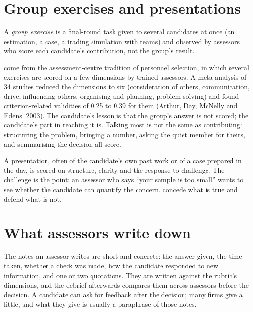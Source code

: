 \section{Group exercises and presentations}

\begin{definition}\label{def:iv:the-final-round-and-trading-games:group}
A \emph{group exercise} is a final-round task given to several candidates at once (an
estimation, a case, a trading simulation with teams) and observed by assessors who score each candidate's
contribution, not the group's result.
\end{definition}

 come from the assessment-centre tradition of personnel selection, in which several exercises
are scored on a few dimensions by trained assessors. A meta-analysis of 34 studies reduced the dimensions to
six (consideration of others, communication, drive, influencing others, organising and planning, problem
solving) and found criterion-related validities of 0.25 to 0.39 for them (Arthur, Day, McNelly and Edens,
2003). The candidate's lesson is that the group's answer is not scored; the candidate's part in reaching it
is. Talking most is not the same as contributing: structuring the problem, bringing a number, asking the quiet
member for theirs, and summarising the decision all score.

A presentation, often of the candidate's own past work or of a case prepared in the day, is scored on
structure, clarity and the response to challenge. The challenge is the point: an assessor who says ``your
sample is too small'' wants to see whether the candidate can quantify the concern, concede what is true and
defend what is not.

\section{What assessors write down}

The notes an assessor writes are short and concrete: the answer given, the time taken, whether a check was
made, how the candidate responded to new information, and one or two quotations. They are written against the
rubric's dimensions, and the debrief afterwards compares them across assessors before the decision. A
candidate can ask for feedback after the decision; many firms give a little, and what they give is usually a
paraphrase of those notes.

